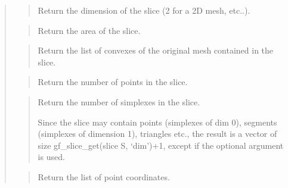 \documentclass[a4paper,11pt,english]{sphinxmanual}
\begin{document}
\sphinxAtStartPar
{}
\begin{quote}

\sphinxAtStartPar
{}
\begin{quote}

\sphinxAtStartPar
Return the dimension of the slice (2 for a 2D mesh, etc..).
\end{quote}

\sphinxAtStartPar
{}
\begin{quote}

\sphinxAtStartPar
Return the area of the slice.
\end{quote}

\sphinxAtStartPar
{}
\begin{quote}

\sphinxAtStartPar
Return the list of convexes of the original mesh contained in the slice.
\end{quote}

\sphinxAtStartPar
{}
\begin{quote}

\sphinxAtStartPar
Return the number of points in the slice.
\end{quote}

\sphinxAtStartPar
{}
\begin{quote}

\sphinxAtStartPar
Return the number of simplexes in the slice.

\sphinxAtStartPar
Since the slice may contain points (simplexes of dim 0), segments
(simplexes of dimension 1), triangles etc., the result is a vector
of size gf\_slice\_get(slice S, ‘dim’)+1, except if the optional argument 
is used.
\end{quote}

\sphinxAtStartPar
{}
\begin{quote}

\sphinxAtStartPar
Return the list of point coordinates.
\end{quote}


\end{quote}
\end{document}
